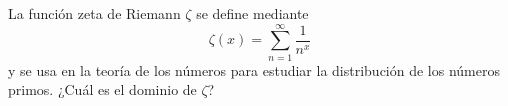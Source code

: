 \item La función zeta de Riemann $\zeta$ se define mediante
    \[ \zeta(x) = \sum_{n=1}^\infty \frac{1}{n^x} \]
    y se usa en la teoría de los números para estudiar la distribución de los números primos. ¿Cuál es el dominio de $\zeta$?
